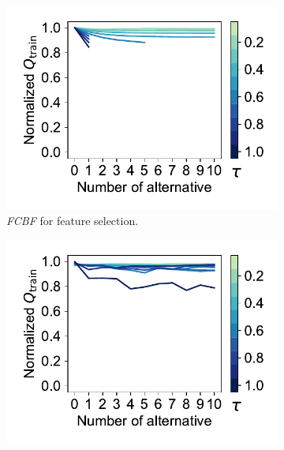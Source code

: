 \documentclass{article}
\theoremstyle{definition}
\begin{document}
\begin{figure}[t]
\begin{subfigure}[t]{0.48\textwidth}
{		}
		\label{fig:afs:impact-num-alternatives-tau-train-objective-max-mrmr}
	\end{subfigure}
	\\ \vspace{\baselineskip}
	\begin{subfigure}[t]{0.48\textwidth}
		\centering
		\includegraphics[width=\textwidth, trim=15 17 10 15, clip]{plots/afs-impact-num-alternatives-tau-train-objective-max-fcbf.pdf}
		\caption{
			\emph{FCBF} for feature selection.
		}
		\label{fig:afs:impact-num-alternatives-tau-train-objective-max-fcbf}
	\end{subfigure}
	\hfill
	\begin{subfigure}[t]{0.48\textwidth}
		\centering
		\includegraphics[width=\textwidth, trim=15 17 10 15, clip]{plots/afs-impact-num-alternatives-tau-train-objective-max-greedy-wrapper.pdf}

\end{subfigure}
\end{figure}
\end{document}
